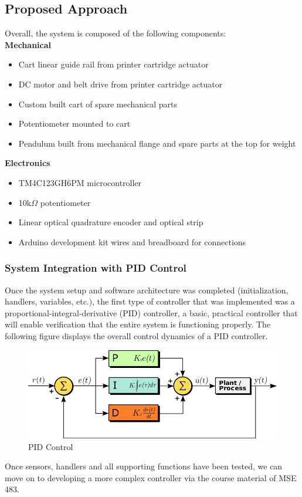 \documentclass[12pt]{article}
\begin{document}
\subsection{Proposed Approach}
Overall, the system is composed of the following components:\\
\textbf{Mechanical}
\begin{itemize}
    \item Cart linear guide rail from printer cartridge actuator
    \item DC motor and belt drive from printer cartridge actuator
    \item Custom built cart of spare mechanical parts
    \item Potentiometer mounted to cart
    \item Pendulum built from mechanical flange and spare parts at the top for weight
\end{itemize}
\textbf{Electronics}
\begin{itemize}
    \item TM4C123GH6PM microcontroller
    \item 10k$\Omega$ potentiometer
    \item Linear optical quadrature encoder and optical strip
    \item Arduino development kit wires and breadboard for connections
\end{itemize}
\subsubsection{System Integration with PID Control}
Once the system setup and software architecture was completed (initialization, handlers, variables, etc.), the first type of controller that was implemented was a proportional-integral-derivative (PID) controller, a basic, practical controller that will enable verification that the entire system is functioning properly. The following figure displays the overall control dynamics of a PID controller.
\begin{figure}[H]
    \centering
    \includegraphics[width=.7\linewidth]{figures/pid.png}
    \caption{PID Control \cite{pid}}
    \label{fig:Resp}
\end{figure}
Once sensors, handlers and all supporting functions have been tested, we can move on to developing a more complex controller via the course material of MSE 483.
\end{document}
